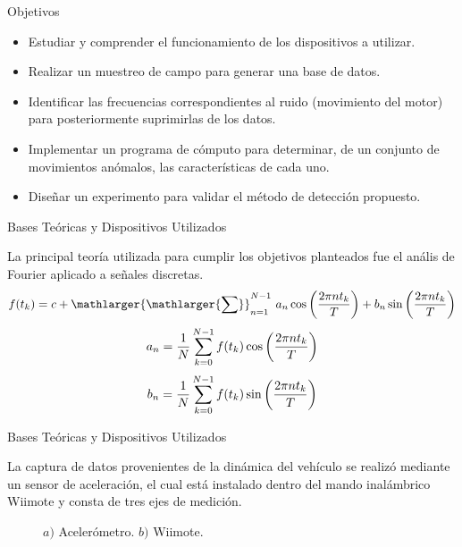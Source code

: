\documentclass[14pt]{beamer}
\begin{document}
\begin{frame}{Objetivos} 

\begin{itemize}
\item \justifying Estudiar y comprender el funcionamiento de los dispositivos a utilizar.
\item \justifying Realizar un muestreo de campo para generar una base de datos.
\item \justifying Identificar las frecuencias correspondientes al ruido (movimiento del motor) para posteriormente suprimirlas de los datos.
\item \justifying Implementar un programa de cómputo para determinar, de un conjunto de movimientos anómalos, las características de cada uno.
\item \justifying Diseñar un experimento para validar el método de detección propuesto.
\end{itemize}

\end{frame}



\begin{frame}{Bases Teóricas y Dispositivos Utilizados}

La principal teoría utilizada para cumplir los objetivos planteados fue el anális de Fourier aplicado a señales discretas.
\vspace{0cm}
$$f(t_{k})=c+ \mathlarger{\mathlarger{\sum}}_{n=1}^{N-1}\ a_{n}\cos{\left( 2\pi nt_{k}\over T\right) } + b_{n}\sin{\left( 2\pi nt_{k}\over T\right) }$$
\vspace{-0.15cm}
\small $$a_{n}={1\over N}\sum_{k=0}^{N-1} f(t_{k})\cos{\left( 2\pi nt_{k}\over T\right) }$$
\vspace{0.2cm}
$$b_{n}={1\over N}\sum_{k=0}^{N-1} f(t_{k})\sin{\left( 2\pi nt_{k}\over T\right)}$$

\end{frame}



\begin{frame}{Bases Teóricas y Dispositivos Utilizados}

La captura de datos provenientes de la dinámica del vehículo se realizó mediante un sensor de aceleración, el cual está instalado dentro del mando inalámbrico Wiimote y consta de tres ejes de medición.

\begin{figure}[H]
\caption{$a)$ Acelerómetro. $b)$ Wiimote.}
\end{figure}

\end{frame}
\end{document}
